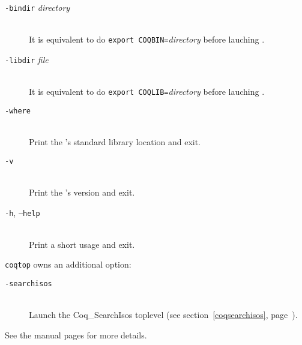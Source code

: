 \begin{description}
\item[{\tt -bindir} {\em directory}]\ \\
  It is equivalent to do \texttt{export COQBIN=}{\em directory}
  before lauching \Coq.

\item[{\tt -libdir} {\em file}]\ \\
  It is equivalent to do \texttt{export COQLIB=}{\em directory}
  before lauching \Coq.
  

\item[{\tt -where}]\ \\
  Print the \Coq's standard library location and exit.

\item[{\tt -v}]\ \\
  Print the \Coq's version and exit.

\item[{\tt -h}, {\tt --help}]\ \\
  Print a short usage and exit.
\end{description}

{\tt coqtop} owns an additional option:

\begin{description}
\item[{\tt -searchisos}]\ \\
  Launch the {\sf Coq\_SearchIsos} toplevel
  (see section~\ref{coqsearchisos}, page~\pageref{coqsearchisos}).
\end{description}

See the manual pages for more details.

